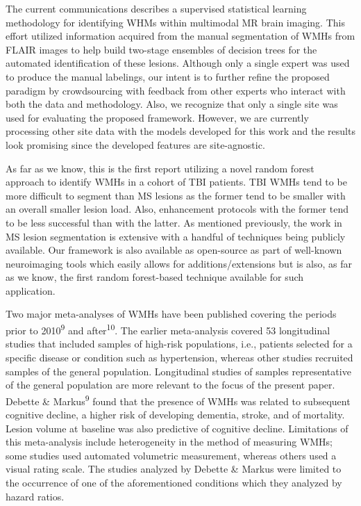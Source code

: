 \documentclass[11pt,]{article}
\begin{document}
The current communications describes a supervised statistical learning
methodology for identifying WHMs within multimodal MR brain imaging.
This effort utilized information acquired from the manual segmentation
of WMHs from FLAIR images to help build two-stage ensembles of decision
trees for the automated identification of these lesions. Although only a
single expert was used to produce the manual labelings, our intent is to
further refine the proposed paradigm by crowdsourcing with feedback from
other experts who interact with both the data and methodology. Also, we
recognize that only a single site was used for evaluating the proposed
framework. However, we are currently processing other site data with the
models developed for this work and the results look promising since the
developed features are site-agnostic.

As far as we know, this is the first report utilizing a novel random
forest approach to identify WMHs in a cohort of TBI patients. TBI WMHs
tend to be more difficult to segment than MS lesions as the former tend
to be smaller with an overall smaller lesion load. Also, enhancement
protocols with the former tend to be less successful than with the
latter. As mentioned previously, the work in MS lesion segmentation is
extensive with a handful of techniques being publicly available. Our
framework is also available as open-source as part of well-known
neuroimaging tools which easily allows for additions/extensions but is
also, as far as we know, the first random forest-based technique
available for such application.

Two major meta-analyses of WMHs have been published covering the periods
prior to 2010\textsuperscript{9} and after\textsuperscript{10}. The
earlier meta-analysis covered 53 longitudinal studies that included
samples of high-risk populations, i.e., patients selected for a specific
disease or condition such as hypertension, whereas other studies
recruited samples of the general population. Longitudinal studies of
samples representative of the general population are more relevant to
the focus of the present paper. Debette \& Markus\textsuperscript{9}
found that the presence of WMHs was related to subsequent cognitive
decline, a higher risk of developing dementia, stroke, and of mortality.
Lesion volume at baseline was also predictive of cognitive decline.
Limitations of this meta-analysis include heterogeneity in the method of
measuring WMHs; some studies used automated volumetric measurement,
whereas others used a visual rating scale. The studies analyzed by
Debette \& Markus were limited to the occurrence of one of the
aforementioned conditions which they analyzed by hazard ratios.
\end{document}
